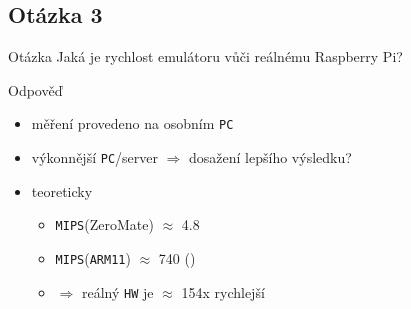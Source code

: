 \documentclass[compress]{beamer}
\begin{document}
\subsection{Otázka 3}

\begin{frame}
	\begin{block}{Otázka}
		Jaká je rychlost emulátoru vůči
		reálnému Raspberry Pi?
	\end{block}
	\begin{block}{Odpověď}
		\begin{itemize}
			\item měření provedeno na osobním \texttt{PC}
			\item výkonnější \texttt{PC}/server $\Rightarrow$ dosažení lepšího výsledku?
			\item teoreticky
			\begin{itemize}
				\item \texttt{MIPS}(ZeroMate) $\approx$ 4.8
				\item \texttt{MIPS}(\texttt{ARM11}) $\approx$ 740 (\href{https://www.vut.cz/www_base/zav_prace_soubor_verejne.php?file_id=16089}{})
				\vspace{0.1cm}
				\item $\Rightarrow$ reálný \texttt{HW} je $\approx$ 154x rychlejší
			\end{itemize}
		\end{itemize}
	\end{block}
\end{frame}
\end{document}
